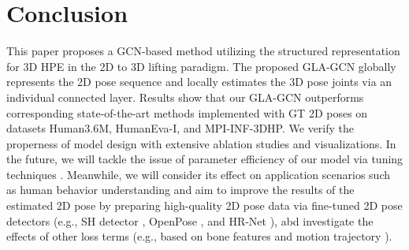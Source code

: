 \documentclass[10pt,twocolumn,letterpaper]{article}
\begin{document}
\section{Conclusion}
This paper proposes a GCN-based method utilizing the structured representation for 3D HPE in the 2D to 3D lifting paradigm. The proposed GLA-GCN globally represents the 2D pose sequence and locally estimates the 3D pose joints via an individual connected layer. Results show that our GLA-GCN outperforms corresponding state-of-the-art methods implemented with GT 2D poses on datasets Human3.6M, HumanEva-I, and MPI-INF-3DHP. We verify the properness of model design with extensive ablation studies and visualizations. In the future, we will tackle the issue of parameter efficiency of our model via tuning techniques \cite{yu2022towards,yu2023visual}. Meanwhile, we will consider its effect on application scenarios such as human behavior understanding \cite{bruce2022mmnet, bruce2021skeleton, bruce2021multimodal,yan2022egcn, bruce2020skeleton} and aim to improve the results of the estimated 2D pose by preparing high-quality 2D pose data via fine-tuned 2D pose detectors (e.g., SH detector \cite{RN003}, OpenPose \cite{RN006}, and  HR-Net \cite{sun2019deep}), abd investigate the effects of other loss terms (e.g., based on bone features \cite{RN019} and motion trajectory \cite{RN014}).

{\small


}
\end{document}
